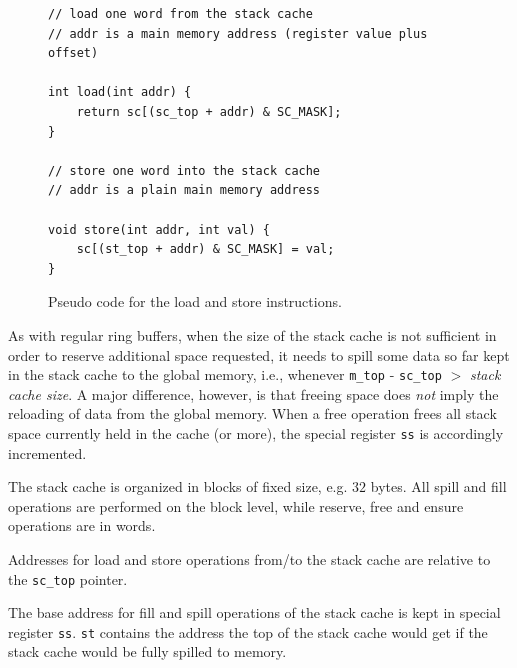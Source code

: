 \documentclass[a4paper,fontsize=10pt,twoside,DIV15,BCOR12mm,headinclude=true,footinclude=false,pagesize,bibtotoc]{scrbook}
\newcommand{\code}[1]{{\texttt{#1}}}
\newcommand{\comment}[3]{

\textsf{\textbf{#1}} {\color{#3}#2}}
\newcommand{\martin}[1]{\comment{Martin}{#1}{Blue}}
\renewcommand{\martin}[1]{}
\begin{document}
\begin{figure}
\begin{lstlisting}
// load one word from the stack cache
// addr is a main memory address (register value plus offset)

int load(int addr) {
    return sc[(sc_top + addr) & SC_MASK];
}

// store one word into the stack cache
// addr is a plain main memory address

void store(int addr, int val) {
    sc[(st_top + addr) & SC_MASK] = val;
}
\end{lstlisting}
	\caption{Pseudo code for the load and store instructions.}
 	\label{fig:ld_st_iml}
\end{figure}

\martin{We might update this section with more content from the S\$ paper}

As with regular ring buffers, when the size of the stack cache is not sufficient
in order to reserve additional space requested, it needs to spill some data
so far kept in the stack cache to the global memory, i.e., whenever
\code{m\_top} - \code{sc\_top} $>$ \emph{stack cache size}. A major difference,
however, is that freeing space does \emph{not} imply the reloading of data from
the global memory. When a free operation frees all stack space currently held in
the cache (or more), the special register \texttt{ss} is accordingly
incremented.

The stack cache is organized in blocks of fixed size, e.g. $32$ bytes. All
spill and fill operations are performed on the block level, while reserve, free
and ensure operations are in words.
\martin{We agreed that some size values are needed in the compiler to
generate correct code (soon). So we might bring in stack cache manipulation
in burst blocks as well.}

Addresses for load and store operations from/to the stack cache are relative to
the \code{sc\_top} pointer.

The base address for fill and spill operations of the stack cache is kept in
special register \texttt{ss}. \texttt{st} contains the address the top of the
stack cache would get if the stack cache would be fully spilled to memory.
\end{document}
